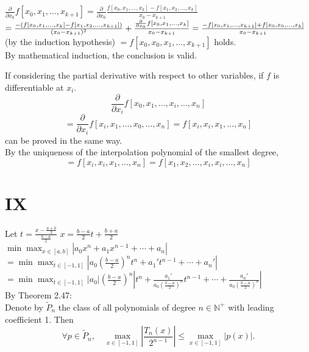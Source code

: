 \documentclass[a4paper]{article}
\begin{document}
\(\frac{\partial}{\partial x_0} f[x_0, x_1, \ldots, x_{k+1}] = \frac{\partial}{\partial x_0} \frac{f[x_0, x_1, \ldots, x_k] - f[x_1, x_2, \ldots, x_k]}{x_0 - x_{k+1}}\)
\(= \frac{-(f[x_0, x_1, \ldots, x_k] - f[x_1, x_2, \ldots, x_{k+1}])}{(x_0 - x_{k+1})^2} + \frac{\frac{\partial}{\partial x_0} f[x_0, x_1, \ldots, x_k]}{x_0 - x_{k+1}} = \\
\frac{-f[x_0, x_1, \ldots, x_{k+1}] + f[x_0, x_0, \ldots, x_k]}{x_0 - x_{k+1}} \) (by the induction hypothesis) \( = f[x_0, x_0, x_1, \ldots, x_{k+1}] \) holds.\\
By mathematical induction, the conclusion is valid.

If considering the partial derivative with respect to other variables, if \( f \) is differentiable at \( x_i \).\\
\[
\frac{\partial}{\partial x_i} f[x_0, x_1, \ldots, x_i, \ldots, x_n]
\]
\[
= \frac{\partial}{\partial x_i} f[x_i, x_1, \ldots, x_0, \ldots, x_n]=f[x_i, x_i, x_1, \ldots, x_n]
\]
can be proved in the same way.\\
By the uniqueness of the interpolation polynomial of the smallest degree,\\
\[
= f[x_i, x_i, x_1, \ldots, x_n] = f[x_1, x_2, \ldots, x_i, x_i, \ldots, x_n]
\]


\section*{IX}
Let \( t = \frac{x - \frac{a+b}{2}}{\frac{b-a}{2}} \)
\( x = \frac{b-a}{2}t + \frac{b+a}{2} \)\\
\( \min \max_{x \in [a, b]} \left| a_0 x^n + a_1 x^{n-1} + \cdots + a_n \right| \)\\
\( = \min \max_{t \in [-1, 1]} \left| a_0 \left(\frac{b-a}{2}\right)^n t^n + a_1' t^{n-1} + \cdots + a_n' \right| \)\\
\( = \min \max_{t \in [-1, 1]} \left| a_0 \right| \left(\frac{b-a}{2}\right)^n \left| t^n + \frac{a_1'}{a_0 \left(\frac{b-a}{2}\right)^n} t^{n-1} + \cdots + \frac{a_n'}{a_0 \left(\frac{b-a}{2}\right)^n} \right| \)\\
By Theorem 2.47:\\
Denote by \( \tilde{P}_{n} \) the class of all polynomials of degree \( n \in \mathbb{N}^{+} \) with leading coefficient 1. Then\\
\[
\forall p \in \tilde{P}_{n}, \quad \max_{x \in [-1,1]} \left| \frac{T_{n}(x)}{2^{n-1}} \right| \leq \max_{x \in [-1,1]} \left| p(x) \right|.
\]
\end{document}
